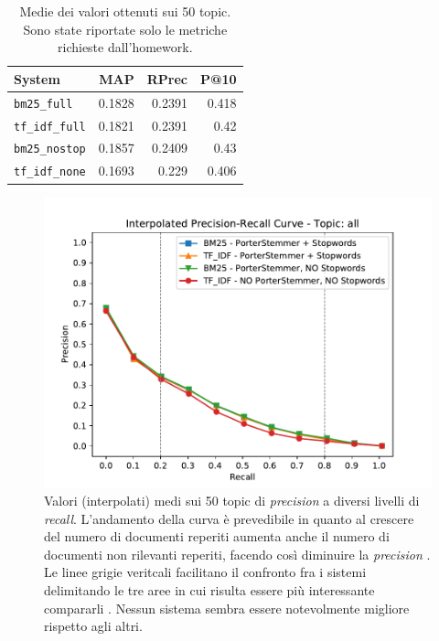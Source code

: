 \documentclass[letterpaper, 10 pt, conference]{ieeeconf}  %
\begin{document}
\begin{table}[h]
\centering
\begin{tabular}{|l|r|r|r|}
\hline
\textbf{System}      & \textbf{MAP} & \textbf{RPrec} & \textbf{P@10} \\ \hline
\texttt{bm25\_full}   & 0.1828       & 0.2391         & 0.418         \\ 
\texttt{tf\_idf\_full} & 0.1821       & 0.2391         & 0.42          \\ 
\texttt{bm25\_nostop} & 0.1857       & 0.2409         & 0.43          \\ 
\texttt{tf\_idf\_none} & 0.1693       & 0.229          & 0.406         \\ \hline
\end{tabular}
\caption{Medie dei valori ottenuti sui 50 topic. Sono state riportate solo le metriche richieste dall'homework.}
\label{tab:recap}
\end{table}

\begin{figure}[h]
    \centering
    \includegraphics[scale=0.55]{figures/iprc.pdf}
    
    \caption{Valori (interpolati) medi sui 50 topic di \textit{precision} a diversi livelli di \textit{recall}. L'andamento della curva è prevedibile in quanto al crescere del numero di documenti reperiti aumenta anche il numero di documenti non rilevanti reperiti, facendo così diminuire la \textit{precision} \cite{measures}. Le linee grigie veritcali facilitano il confronto fra i sistemi delimitando le tre aree in cui risulta essere più interessante compararli \cite{measures}. Nessun sistema sembra essere notevolmente migliore rispetto agli altri.}
    \label{fig:iprc}
\end{figure}
\end{document}
